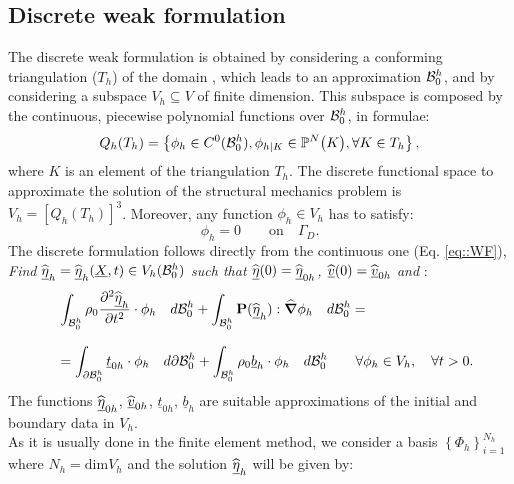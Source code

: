 \subsection{Discrete weak formulation}
\label{sct-DiscreteWF} The discrete weak formulation is obtained by
considering a conforming triangulation ($T_h$) of the domain \RefCon,
which leads to an approximation $\mathcal{B}_0^h$, and by considering
a subspace $V_h\subseteq V$ of finite dimension. This subspace is
composed by the continuous, piecewise polynomial functions over
$\mathcal{B}_0^h$, in formulae:
\begin{equation}
  Q_h(T_h)=\left\{\phi_h \in C^0(\mathcal{B}_0^h),
    \phi_{h|K} \in \mathbb{P}^N\big(K\big), \forall K \in T_h\right\},
  \label{eq::SpaceDiscrete}
\end{equation}
where $K$ is an element of the triangulation $T_h$. The
discrete functional space to approximate the solution of the
structural mechanics problem is
$V_h=\left[Q_h(T_h)\right]^3$. Moreover, any function $\phi_h\in V_h$
has to satisfy:
\begin{displaymath}
  \phi_h=0 \qquad \text{on}\quad\Gamma_D.
\end{displaymath}
The discrete formulation follows directly from the
continuous one (Eq. \eqref{eq::WF}),\\ \textit{Find
  $\widehat{\underline{\eta}}_h=\widehat{\underline{\eta}}_h(\underline{X},t)\in V_h(\mathcal{B}_0^h)$ such that
  $\widehat{\underline{\eta}}(0)=\widehat{\underline{\eta}}_{0h}$, $\widehat{\underline{v}}(0)=\widehat{\underline{v}}_{0h}$ and} :
\begin{equation}
  \begin{array}{lll} & \displaystyle
    \int_{\mathcal{B}_0^h}\rho_0\frac{\partial^2 \widehat{\underline{\eta}}_h}{\partial
      t^2}\cdot\phi_h\quad d\mathcal{B}_0^h +
    \int_{\mathcal{B}_0^h}\textbf{P}(\widehat{\underline{\eta}}_h):\widehat{\boldsymbol{\nabla}}\phi_h\quad d\mathcal{B}_0^h = \\
    \\ & \displaystyle = \int_{\partial
      \mathcal{B}_0^h}\underline{t}_{0h}\cdot\phi_h\quad d\partial\mathcal{B}_0^h +
    \int_{\mathcal{B}_0^h}\rho_0 \underline{b}_h\cdot\phi_h\quad d\mathcal{B}_0^h
    \qquad \forall \phi_h\in V_h, \quad \forall t>0.
  \end{array}
  \label{eq::DWF}
\end{equation}
The functions
$\widehat{\underline{\eta}}_{0h}$, $\widehat{\underline{v}}_{0h}$, $\underline{t}_{0h}$, $\underline{b}_h$ are
suitable approximations of the initial and boundary data in $V_h$.\\
As it is usually done in the finite element method, we consider a
basis $\left\{\Phi_h\right\}_{i=1}^{N_h}$ where $N_h=\text{dim}V_h$
and the solution $\widehat{\underline{\eta}}_h$ will be given by:
